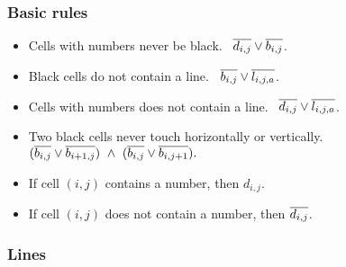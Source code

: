 \documentclass[a4paper]{article}
\newcommand{\N}[1]{\overline{#1\vphantom{l}}}
\begin{document}
\subsubsection{Basic rules}
\begin{itemize}
\item Cells with numbers never be black. \
  $\N{d_{i,j}}\lor\N{b_{i,j}}$.

\item Black cells do not contain a line. \
  $\N{b_{i,j}}\lor\N{l_{i,j,a}}$.

\item Cells with numbers does not contain a line. \
  $\N{d_{i,j}}\lor\N{l_{i,j,a}}$.

\item
  Two black cells never touch horizontally or vertically.
  $
    (\N{b_{i,j}}\lor\N{b_{i+1,j}})
   \ {}\land{}\
    (\N{b_{i,j}}\lor\N{b_{i,j+1}}).
  $

\item
  If cell $(i,j)$ contains a number, then $d_{i,j}$.
\item
  If cell $(i,j)$ does not contain a number, then $\N{d_{i,j}}$.
\end{itemize}

\subsubsection{Lines}
\end{document}
